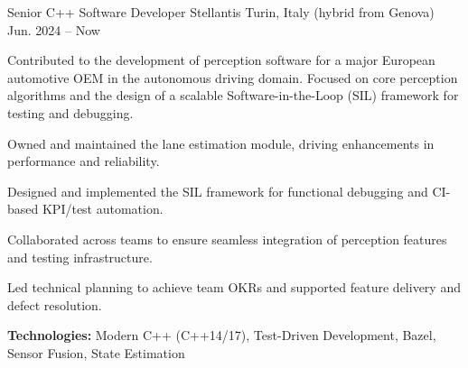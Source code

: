
\begin{cventries}

  \cventry
  {Senior C++ Software Developer} %
  {Stellantis} %
  {Turin, Italy (hybrid from Genova) } %
  {Jun. 2024 -- Now} %
  {
    Contributed to the development of perception software for a major European automotive OEM in the autonomous driving domain. Focused on core perception algorithms and the design of a scalable Software-in-the-Loop (SIL) framework for testing and debugging.
    \vspace{2em}
    \begin{cvitems}
    \item {Owned and maintained the lane estimation module, driving enhancements in performance and reliability.}
    \item {Designed and implemented the SIL framework for functional debugging and CI-based KPI/test automation.}
    \item {Collaborated across teams to ensure seamless integration of perception features and testing infrastructure.}
    \item {Led technical planning to achieve team OKRs and supported feature delivery and defect resolution.}
    \item {\textbf{Technologies:} Modern C++ (C++14/17), Test-Driven Development, Bazel, Sensor Fusion, State Estimation}
    \end{cvitems}
  }



\end{cventries}
